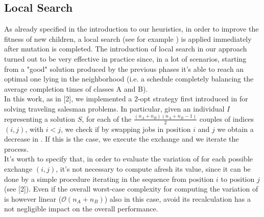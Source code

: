 \documentclass[opre,nonblindrev]{informs3} %
\begin{document}
\subsection{Local Search}
As already specified in the introduction to our heuristics, in order to improve the fitness of new children, a local search (see for example \cite{local}) is applied immediately after mutation is completed. The introduction of local search in our approach turned out to be very effective in practice since, in a lot of scenarios, starting from a "good" solution produced by the previous phases it's able to reach an optimal one lying in the neighborhood (i.e. a schedule completely balancing the average completion times of classes A and B).\\
In this work, as in [2], we implemented a 2-opt strategy first introduced in \cite{2-opt} for solving traveling salesman problems. In particular, given an individual $I$ representing a solution $S$, for each of the $\frac{(n_A+n_B)(n_A+n_B-1)}{2}$ couples of indices $(i,j)$, with $i<j$,  we check if by swapping jobs in position $i$ and $j$ we obtain a decrease in . If this is the case, we execute the exchange and we iterate the process.\\
It's worth to specify that, in order to evaluate the variation of  for each possible exchange $(i,j)$, it's not necessary to compute afresh its value, since it can be done by a simple procedure iterating in the sequence from position $i$ to position $j$ (see [2]). Even if the overall worst-case complexity for computing the variation of  is however linear ($\mathcal{O}(n_A+n_B)$) also in this case, avoid its recalculation has a not negligible impact on the overall performance.
\end{document}
